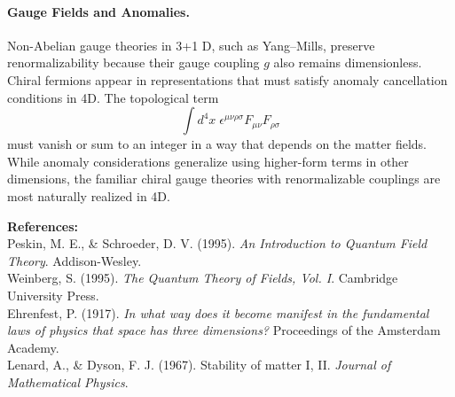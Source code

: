 \begin{technical}
    \paragraph{Gauge Fields and Anomalies.}
    Non-Abelian gauge theories in 3+1 D, such as Yang–Mills, preserve renormalizability because their gauge coupling $g$ also remains dimensionless. Chiral fermions appear in representations that must satisfy anomaly cancellation conditions in 4D. The topological term
    $$
    \int d^4 x \;\epsilon^{\mu\nu\rho\sigma} F_{\mu\nu} F_{\rho\sigma}
    $$
    must vanish or sum to an integer in a way that depends on the matter fields. While anomaly considerations generalize using higher-form terms in other dimensions, the familiar chiral gauge theories with renormalizable couplings are most naturally realized in 4D.
    
    \vspace{0.5em}
    \noindent
    \textbf{References:}\\
    {\footnotesize
    Peskin, M. E., \& Schroeder, D. V. (1995). \textit{An Introduction to Quantum Field Theory}. Addison-Wesley.\\
    Weinberg, S. (1995). \textit{The Quantum Theory of Fields, Vol. I}. Cambridge University Press.\\
    Ehrenfest, P. (1917). \textit{In what way does it become manifest in the fundamental laws of physics that space has three dimensions?} Proceedings of the Amsterdam Academy.\\
    Lenard, A., \& Dyson, F. J. (1967). Stability of matter I, II. \textit{Journal of Mathematical Physics}.
    }
    
\end{technical}
    